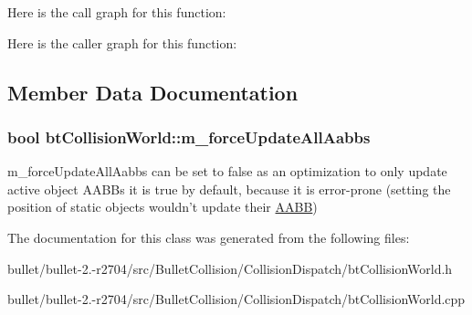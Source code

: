 Here is the call graph for this function\+:




Here is the caller graph for this function\+:




\subsection{Member Data Documentation}
\hypertarget{classbt_collision_world_a91b110fc2501b965cdcaa2a6e1d89999}{
\subsubsection[{m\+\_\+force\+Update\+All\+Aabbs}]{\setlength{\rightskip}{0pt plus 5cm}bool bt\+Collision\+World\+::m\+\_\+force\+Update\+All\+Aabbs\hspace{0.3cm}{\ttfamily [protected]}}}\label{classbt_collision_world_a91b110fc2501b965cdcaa2a6e1d89999}
m\+\_\+force\+Update\+All\+Aabbs can be set to false as an optimization to only update active object A\+A\+B\+Bs it is true by default, because it is error-\/prone (setting the position of static objects wouldn't update their \hyperlink{class_a_a_b_b}{A\+A\+B\+B}) 

The documentation for this class was generated from the following files\+:\begin{DoxyCompactItemize}
\item 
bullet/bullet-\/2.-\/r2704/src/\+Bullet\+Collision/\+Collision\+Dispatch/bt\+Collision\+World.\+h\item 
bullet/bullet-\/2.-\/r2704/src/\+Bullet\+Collision/\+Collision\+Dispatch/bt\+Collision\+World.\+cpp\end{DoxyCompactItemize}
